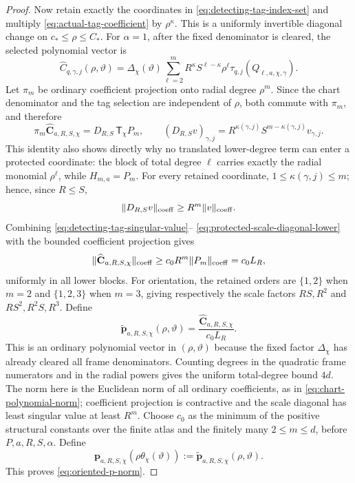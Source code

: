 \documentclass[11pt]{article}
\numberwithin{equation}{section}
\theoremstyle{remark}
\theoremstyle{definition}
\newcommand{\norm}[1]{\lVert #1\rVert}
\begin{document}
\begin{proof}
Now retain exactly the coordinates in \eqref{eq:detecting-tag-index-set}
and multiply \eqref{eq:actual-tag-coefficient} by $\rho^\kappa$.
This is a uniformly invertible diagonal change on
$c_*\le\rho\le C_*$.  For $\alpha=1$, after the fixed denominator is
cleared, the selected polynomial vector is
\begin{equation}\label{eq:protected-tag-vector}
 \widehat C_{q,\gamma,j}(\rho,\vartheta)
 =\Delta_\chi(\vartheta)
  \sum_{\ell=2}^mR^\kappa S^{\ell-\kappa}\rho^\ell
  \tau_{q,j}(Q_{\ell,a,\chi,\gamma}).
\end{equation}
Let $\pi_m$ be ordinary coefficient projection onto radial degree
$\rho^m$.  Since the chart denominator and the tag selection are
independent of $\rho$, both commute with $\pi_m$, and therefore
\begin{equation}\label{eq:protected-radial-projection}
 \pi_m\widehat{\mathbf C}_{a,R,S,\chi}
 =D_{R,S}\,\mathsf T_\chi P_m,
 \qquad
 (D_{R,S}v)_{\gamma,j}
 =R^{\kappa(\gamma,j)}S^{m-\kappa(\gamma,j)}v_{\gamma,j}.
\end{equation}
This identity also shows directly why no translated lower-degree term can
enter a protected coordinate: the block of total degree $\ell$ carries
exactly the radial monomial $\rho^\ell$, while $H_{m,a}=P_m$.
For every retained coordinate,
$1\le\kappa(\gamma,j)\le m$; hence, since $R\le S$,
\begin{equation}\label{eq:protected-scale-diagonal-lower}
 \norm{D_{R,S}v}_{\rm coeff}
 \ge R^m\norm v_{\rm coeff}.
\end{equation}
Combining \eqref{eq:detecting-tag-singular-value}--
\eqref{eq:protected-scale-diagonal-lower} with the bounded coefficient
projection gives
\begin{equation}\label{eq:protected-vector-norm}
 \norm{\widehat{\mathbf C}_{a,R,S,\chi}}_{\rm coeff}
 \ge c_0R^m\norm{P_m}_{\rm coeff}=c_0L_R,
\end{equation}
uniformly in all lower blocks.  For orientation, the retained orders are
$\{1,2\}$ when $m=2$ and $\{1,2,3\}$ when $m=3$, giving respectively the
scale factors $RS,R^2$ and $RS^2,R^2S,R^3$.
Define
\[
 \widetilde{\mathbf p}_{a,R,S,\chi}(\rho,\vartheta)
 =\frac{\widehat{\mathbf C}_{a,R,S,\chi}}{c_0L_R}.
\]
This is an ordinary polynomial vector in $(\rho,\vartheta)$ because the
fixed factor $\Delta_\chi$ has already cleared all frame denominators.
Counting degrees in the quadratic frame numerators and in the radial
powers gives the uniform total-degree bound $4d$.  The norm here is the
Euclidean norm of all ordinary coefficients, as in
\eqref{eq:chart-polynomial-norm}; coefficient projection is contractive
and the scale diagonal has least singular value at least $R^m$.
Choose $c_0$ as the minimum of the positive structural constants over
the finite atlas and the finitely many $2\le m\le d$, before
$P,a,R,S,\alpha$.
Define
\[
 \mathbf p_{a,R,S,\chi}(\rho\theta_\chi(\vartheta))
 :=\widetilde{\mathbf p}_{a,R,S,\chi}(\rho,\vartheta).
\]
This proves \eqref{eq:oriented-p-norm}.


\end{proof}
\end{document}
